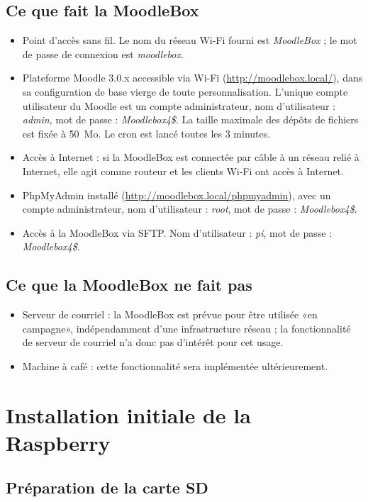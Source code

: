 \documentclass[11pt]{article}
\begin{document}
\subsection{Ce que fait la MoodleBox}

\begin{itemize}
\item Point d'accès sans fil. Le nom du réseau Wi-Fi fourni est \emph{MoodleBox} ; le mot de passe de connexion est \emph{moodlebox}.
\item Plateforme Moodle 3.0.x accessible via Wi-Fi (\url{http://moodlebox.local/}), dans sa configuration de base vierge de toute personnalisation. L'unique compte utilisateur du Moodle est un compte administrateur, nom d'utilisateur : \emph{admin}, mot de passe : \emph{Moodlebox4\$}. La taille maximale des dépôts de fichiers est fixée à 50~Mo. Le cron est lancé toutes les 3 minutes.
\item Accès à Internet : si la MoodleBox est connectée par câble à un réseau relié à Internet, elle agit comme routeur et les clients Wi-Fi ont accès à Internet.
\item PhpMyAdmin installé (\url{http://moodlebox.local/phpmyadmin}), avec un compte administrateur, nom d'utilisateur : \emph{root}, mot de passe : \emph{Moodlebox4\$}.
\item Accès à la MoodleBox via SFTP. Nom d'utilisateur : \emph{pi}, mot de passe : \emph{Moodlebox4\$}.
\end{itemize}

\subsection{Ce que la MoodleBox ne fait pas}

\begin{itemize}
\item Serveur de courriel : la MoodleBox est prévue pour être utilisée «en campagne», indépendamment d'une infrastructure réseau ; la fonctionnalité de serveur de courriel n'a donc pas d'intérêt pour cet usage.
\item Machine à café : cette fonctionnalité sera implémentée ultérieurement.
\end{itemize}


\section{Installation initiale de la Raspberry}

\subsection{Préparation de la carte SD}
\end{document}

